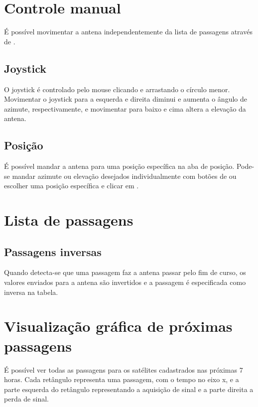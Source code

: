 \documentclass[12pt, a4paper]{article}
\begin{document}
\section{Controle manual}
É possível movimentar a antena independentemente da lista de passagens através
de .

\subsection{Joystick}
O joystick é controlado pelo mouse clicando e arrastando o círculo menor.
Movimentar o joystick para a esquerda e direita diminui e aumenta o ângulo de
azimute, respectivamente, e movimentar para baixo e cima altera a elevação da antena.

\subsection{Posição}
É possível mandar a antena para uma posição específica na aba de posição.
Pode-se mandar azimute ou elevação desejados individualmente com botões de
\menu{\textgreater} ou escolher uma posição específica e clicar em .

\section{Lista de passagens}
\subsection{Passagens inversas}
Quando detecta-se que uma passagem faz a antena passar pelo fim de curso, os
valores enviados para a antena são invertidos e a passagem é especificada como
inversa na tabela.

\section{Visualização gráfica de próximas passagens}
É possível ver todas as passagens para os satélites cadastrados nas próximas 7
horas. Cada retângulo representa uma passagem, com o tempo no eixo x, e a parte
esquerda do retângulo representando a aquisição de sinal e a parte direita a
perda de sinal.
\end{document}
